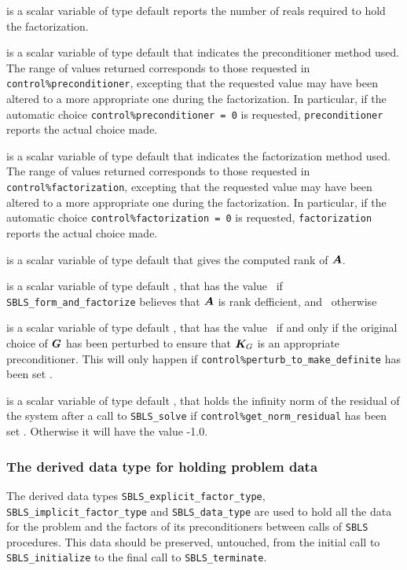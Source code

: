 \documentclass{galahad}
\newcommand{\packagename}{SBLS}
\begin{document}
\begin{description}
 is a scalar variable of type default \integer
reports the number of reals required to hold the factorization.

 is a scalar variable of type default \integer
that indicates the preconditioner method used. The range of values returned
corresponds to those requested in {\tt control\%preconditioner}, 
excepting that the requested value may have been altered to a more
appropriate one during the factorization. In particular, if the automatic
choice {\tt control\%preconditioner = 0} is requested,
{\tt preconditioner} reports the actual choice made.

 is a scalar variable of type default \integer
that indicates the factorization method used. The range of values returned
corresponds to those requested in {\tt control\%factorization}, 
excepting that the requested value may have been altered to a more
appropriate one during the factorization.
In particular, if the automatic
choice {\tt control\%factorization = 0} is requested,
{\tt factorization} reports the actual choice made.

 is a scalar variable of type default \integer that gives the
computed rank of ${\bm{A}}$.

 is a scalar variable of type default \logical, that has the
value \true\ if {\tt \packagename\_form\_and\_factorize} believes that
${\bm{A}}$ is rank defficient, and \false\ otherwise

 is a scalar variable of type default \logical, that has the
value \true\ if and only if the original choice of ${\bm{G}}$ has been perturbed to
ensure that ${\bm{K}}_G$ is an appropriate preconditioner. This will only
happen if {\tt control\-\%perturb\_to\_make\_definite} has been set \true.

 is a scalar variable of type default \realdp, 
that holds the infinity norm of the residual of the system 
after a call to {\tt \packagename\_solve} if {\tt control\%get\_norm\_residual}
has been set \true. Otherwise it will have the value -1.0.

\end{description}


\subsubsection{The derived data type for holding problem data}\label{typedata}
The derived data types 
{\tt \packagename\_explicit\_factor\_type},
{\tt \packagename\_implicit\_factor\_type} and
{\tt \packagename\_data\_type} 
are used to hold all the data for the problem and the factors of
its preconditioners between calls of 
{\tt \packagename} procedures. 
This data should be preserved, untouched, from the initial call to 
{\tt \packagename\_initialize}
to the final call to
{\tt \packagename\_terminate}.
\end{document}
